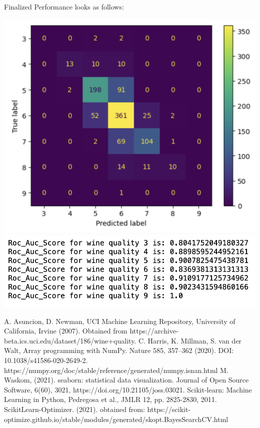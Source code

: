 \documentclass[titlepage]{article}
\begin{document}
Finalized Performance looks as follows:  

\begin{center}
	\includegraphics[width=.45\textwidth]{img/finalperform.png}
	\includegraphics[width=.75\textwidth]{img/finalrocaucscore.png}
\end{center}

\begin{thebibliography}{9}
	 A. Asuncion, D. Newman, UCI Machine Learning Repository, University of California, Irvine  (2007).  Obtained from https://archive-beta.ics.uci.edu/dataset/186/wine+quality. 
	 C. Harris, K. Millman, S. van der Walt,  Array programming with NumPy. Nature 585, 357–362 (2020). DOI: 10.1038/s41586-020-2649-2.  https://numpy.org/doc/stable/reference/generated/numpy.isnan.html
	 M. Waskom, (2021). seaborn: statistical data visualization. Journal of Open Source Software, 6(60), 3021, https://doi.org/10.21105/joss.03021.
	Scikit-learn: Machine Learning in Python, Pedregosa et al., JMLR 12, pp. 2825-2830, 2011. 
	 ScikitLearn-Optimizer. (2021). obtained from: https://scikit-optimize.github.io/stable/modules/generated/skopt.BayesSearchCV.html
\end{thebibliography}
\end{document}
